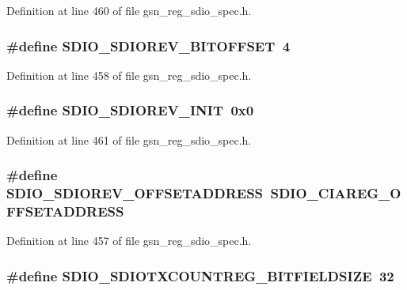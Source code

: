 Definition at line 460 of file gsn\_\-reg\_\-sdio\_\-spec.h.

\hypertarget{a00571_a802e3d04dae2faa70daade1d3ccf4418}{
\subsubsection[{SDIO\_\-SDIOREV\_\-BITOFFSET}]{\setlength{\rightskip}{0pt plus 5cm}\#define SDIO\_\-SDIOREV\_\-BITOFFSET~4}}
\label{a00571_a802e3d04dae2faa70daade1d3ccf4418}


Definition at line 458 of file gsn\_\-reg\_\-sdio\_\-spec.h.

\hypertarget{a00571_a8c51dddbd1b35a98185a20f45a3db338}{
\subsubsection[{SDIO\_\-SDIOREV\_\-INIT}]{\setlength{\rightskip}{0pt plus 5cm}\#define SDIO\_\-SDIOREV\_\-INIT~0x0}}
\label{a00571_a8c51dddbd1b35a98185a20f45a3db338}


Definition at line 461 of file gsn\_\-reg\_\-sdio\_\-spec.h.

\hypertarget{a00571_a8961e5c63b78a8a28e9879c61ab45c1e}{
\subsubsection[{SDIO\_\-SDIOREV\_\-OFFSETADDRESS}]{\setlength{\rightskip}{0pt plus 5cm}\#define SDIO\_\-SDIOREV\_\-OFFSETADDRESS~SDIO\_\-CIAREG\_\-OFFSETADDRESS}}
\label{a00571_a8961e5c63b78a8a28e9879c61ab45c1e}


Definition at line 457 of file gsn\_\-reg\_\-sdio\_\-spec.h.

\hypertarget{a00571_a61d87fe9631a61d2069e4dbcb342eee8}{
\subsubsection[{SDIO\_\-SDIOTXCOUNTREG\_\-BITFIELDSIZE}]{\setlength{\rightskip}{0pt plus 5cm}\#define SDIO\_\-SDIOTXCOUNTREG\_\-BITFIELDSIZE~32}}
\label{a00571_a61d87fe9631a61d2069e4dbcb342eee8}


